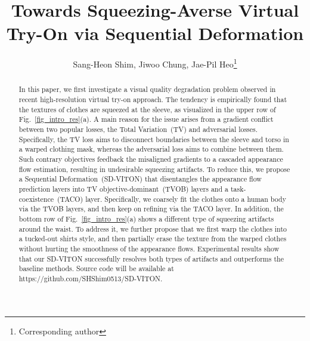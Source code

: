 \documentclass[letterpaper]{article} %
\title{Towards Squeezing-Averse Virtual Try-On via Sequential Deformation}
\author{
    Sang-Heon Shim,
    Jiwoo Chung,
    Jae-Pil Heo\thanks{Corresponding author}
}
\begin{document}
\maketitle


\begin{abstract}
    In this paper, we first investigate a visual quality degradation problem observed in recent high-resolution virtual try-on approach.
    The tendency is empirically found that the textures of clothes are squeezed at the sleeve, as visualized in the upper row of Fig.~\ref{fig_intro_res}(a).
    A main reason for the issue arises from a gradient conflict between two popular losses, the Total Variation~(TV) and adversarial losses.
    Specifically, the TV loss aims to disconnect boundaries between the sleeve and torso in a warped clothing mask, whereas the adversarial loss aims to combine between them.
    Such contrary objectives feedback the misaligned gradients to a cascaded appearance flow estimation, resulting in undesirable squeezing artifacts.
    To reduce this, we propose a Sequential Deformation~(SD-VITON) that disentangles the appearance flow prediction layers into TV objective-dominant~(TVOB) layers and a task-coexistence~(TACO) layer.
    Specifically, we coarsely fit the clothes onto a human body via the TVOB layers, and then keep on refining via the TACO layer.
    In addition, the bottom row of Fig.~\ref{fig_intro_res}(a) shows a different type of squeezing artifacts around the waist.
    To address it, we further propose that we first warp the clothes into a tucked-out shirts style, and then partially erase the texture from the warped clothes without hurting the smoothness of the appearance flows.
    Experimental results show that our SD-VITON successfully resolves both types of artifacts and outperforms the baseline methods.
    Source code will be available at https://github.com/SHShim0513/SD-VITON.
\end{abstract}
\end{document}
